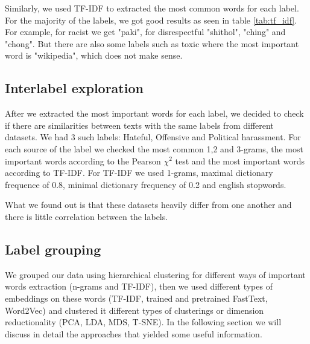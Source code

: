 \documentclass[fleqn,moreauthors,10pt]{ds_report}
\begin{document}
Similarly, we used TF-IDF to extracted the most common words for each label. For the majority of the labels, we got good results as seen in table \ref{tab:tf_idf}. For example, for racist we get "paki", for disrespectful "shithol", "ching" and "chong". But there are also some labels such as toxic where the most important word is "wikipedia", which does not make sense. 

\subsection*{Interlabel exploration}

After we extracted the most important words for each label, we decided to check if there are similarities between texts with the same labels from different datasets. We had 3 such labels: Hateful, Offensive and Political harassment. For each source of the label we checked the most common 1,2 and 3-grams, the most important words according to the Pearson $\chi^2$ test and the most important words according to TF-IDF. For TF-IDF we used 1-grams, maximal dictionary frequence of 0.8, minimal dictionary frequency of 0.2 and english stopwords.

What we found out is that these datasets heavily differ from one another and there is little correlation between the labels.

\subsection*{Label grouping}
We grouped our data using hierarchical clustering for different ways of important words extraction (n-grams and TF-IDF), then we used different types of embeddings on these words (TF-IDF, trained and pretrained FastText, Word2Vec) and clustered it different types of clusterings or dimension reductionality (PCA, LDA, MDS, T-SNE). In the following section we will discuss in detail the approaches that yielded some useful information.  
\end{document}
